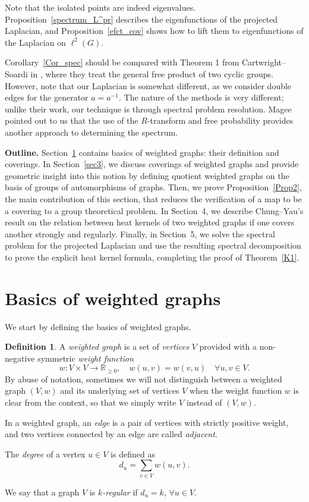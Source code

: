 \documentclass[11pt]{amsart}
\newcommand{\R}{\mathbb{R}}
\theoremstyle{definition}
\newtheorem{definition}{Definition}
\theoremstyle{remark}
\theoremstyle{plain}
\numberwithin{equation}{section}
\numberwithin{lemma}{section}
\numberwithin{definition}{section}
\numberwithin{proposition}{section}
\numberwithin{corollary}{section}
\numberwithin{theorem}{section}
\numberwithin{remark}{section}
\begin{document}
Note that the isolated points are indeed eigenvalues. Proposition~\ref{spectrum_L^pr} describes the eigenfunctions of the projected Laplacian, and Proposition~\ref{efct_cov} shows how to lift them to eigenfunctions of the Laplacian on $\ell^2(G)$.

Corollary~\ref{Cor_spec} should be compared with Theorem 1 from Cartwright--Soardi in \cite{MR820357}, where they treat the general free product of two cyclic groups. However, note that our Laplacian is somewhat different, as we consider double edges for the generator $a=a^{-1}$. The nature of the methods is very different; unlike their work, our technique is through spectral problem resolution. Magee pointed out to us that the use of the $R$-transform and free probability provides another approach to determining the spectrum.

{\bf Outline.} 
Section~\ref{sec2} contains basics of weighted graphs: their definition and coverings.
In Section~\ref{sec3}, we discuss coverings of weighted graphs and provide geometric insight into this notion by defining quotient weighted graphs on the basis of groups of automorphisms of graphs. Then, we prove Proposition~\ref{Prop2}, the main contribution of this section, that reduces the verification of a map to be a covering to a group theoretical problem. 
In Section~4, we describe Chung--Yau's result on the relation between heat kernels of two weighted graphs if one covers another strongly and regularly.
Finally, in Section~5, we solve the spectral problem for the projected Laplacian and use the resulting spectral decomposition to prove the explicit heat kernel formula, completing the proof of Theorem~\ref{K1}.

\section{Basics of weighted graphs}\label{sec2}
We start by defining the basics of weighted graphs.
\begin{definition}
 A \textit{weighted graph} is a set of \textit{vertices} $V$ provided with a non-negative symmetric \textit{weight function} 
 $$
 w\colon V\times V\to \R_{\geq 0},\quad w(u,v)=w(v,u)\quad \forall u,v \in V.
 $$
 By abuse of notation, sometimes we will not distinguish between a weighted graph $(V,w)$ and its underlying set of vertices $V$ when the weight function $w$ is clear from the context, so that we simply write $V$ instead of $(V,w)$.

 In a weighted graph, an \textit{edge} is a pair of vertices with strictly positive weight, and two vertices connected by an edge are called \textit{adjacent}.
 
 The \textit{degree} of a vertex $u\in V$ is defined as 
 $$
 d_u=\sum_{v\in V}w(u,v).
 $$
 
 We say that a graph $V$ is \textit{$k$-regular} if $d_u=k$, $\forall u\in V$.
\end{definition}
\end{document}
